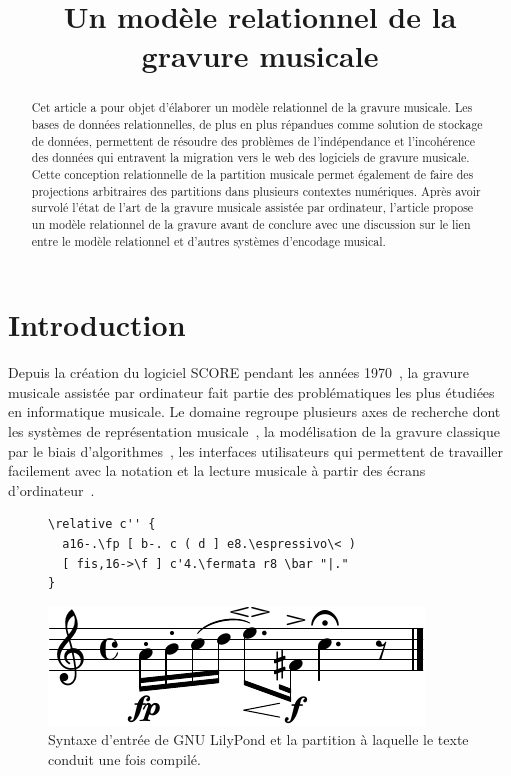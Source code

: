 \documentclass{article}
\title{Un modèle relationnel de la gravure musicale}
\begin{document}
%
\capstartfalse
\maketitle
\capstarttrue
%
\begin{abstract}
Cet article a pour objet d'élaborer un modèle relationnel de la gravure
musicale. Les bases de données relationnelles, de plus en plus répandues
comme solution de stockage de données,
permettent de résoudre des problèmes de l'indépendance et
l'incohérence des données qui entravent la migration vers le web des
logiciels de gravure musicale. Cette conception relationnelle de la partition
musicale permet également de faire des projections arbitraires des partitions
dans plusieurs contextes numériques. Après avoir survolé l'état de l'art de
la gravure musicale assistée par ordinateur, l'article propose un modèle relationnel de la
gravure avant de conclure avec une discussion sur le lien entre le modèle
relationnel et d'autres systèmes d'encodage musical.
\end{abstract}
\section{Introduction}
Depuis la création du logiciel SCORE pendant les années
1970~\cite{smith1972score}, la gravure musicale assistée par ordinateur fait
partie des problématiques les plus étudiées en informatique musicale.
Le domaine regroupe plusieurs axes de recherche dont les systèmes de
représentation musicale~\cite{good2003using}\-\cite{hoos1998guido}\-\cite{good2001musicxml},
la modélisation de la gravure classique par le biais
d'algorithmes~\cite{hegazy1988optimal}\-\cite{blostein1991justification},
les interfaces utilisateurs qui permettent de travailler facilement avec
la notation et la lecture musicale à partir des écrans d'ordinateur~\cite{fitzpatrick1998networked}\-\cite{qian2002portable}\-\cite{egyud1998hand}.
\begin{figure}[h]
\begin{Verbatim}[frame=single,fontsize=\relsize{-1}]
\relative c'' {
  a16-.\fp [ b-. c ( d ] e8.\espressivo\< )
  [ fis,16->\f ] c'4.\fermata r8 \bar "|."
}
\end{Verbatim}
\begin{center}
\includegraphics{example_preview.pdf}
\end{center}
\caption{Syntaxe d'entrée de GNU LilyPond et la partition à laquelle le
texte conduit une fois compilé.}
\end{figure}
\end{document}
